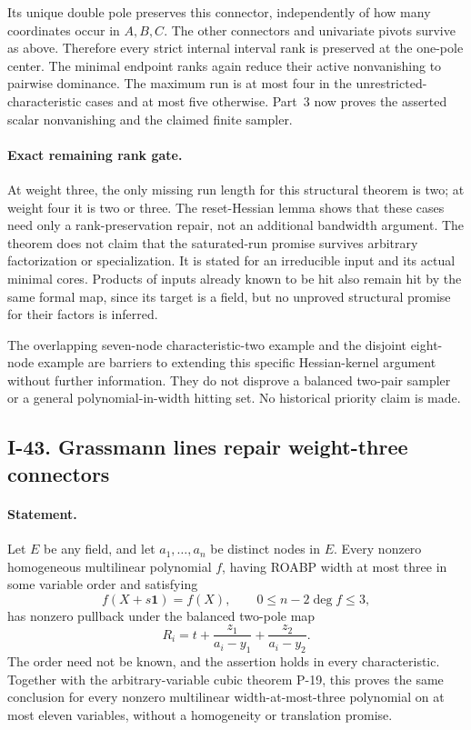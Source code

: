 Its unique double pole preserves this connector, independently
of how many coordinates occur in $A,B,C$. The other connectors
and univariate pivots survive as above. Therefore every strict
internal interval rank is preserved at the one-pole center.
The minimal endpoint ranks again reduce their active
nonvanishing to pairwise dominance. The maximum run is at
most four in the unrestricted-characteristic cases and at
most five otherwise. Part~3 now proves the asserted scalar
nonvanishing and the claimed finite sampler.

\paragraph{Exact remaining rank gate.}
At weight three, the only missing run length for this
structural theorem is two; at weight four it is two or three.
The reset-Hessian lemma shows that these cases need only a
rank-preservation repair, not an additional bandwidth argument.
The theorem does not claim that the saturated-run promise
survives arbitrary factorization or specialization. It is
stated for an irreducible input and its actual minimal cores.
Products of inputs already known to be hit also remain hit
by the same formal map, since its target is a field, but no
unproved structural promise for their factors is inferred.

The overlapping seven-node characteristic-two example and the
disjoint eight-node example are barriers to extending this
specific Hessian-kernel argument without further information.
They do not disprove a balanced two-pair sampler or a general
polynomial-in-width hitting set. No historical priority claim
is made.


\subsection{I-43. Grassmann lines repair weight-three connectors}
\label{I-43}

\paragraph{Statement.}
Let $E$ be any field, and let $a_1,\ldots,a_n$ be distinct
nodes in $E$. Every nonzero homogeneous multilinear polynomial
$f$, having ROABP width at most three in some variable order
and satisfying
\[
 f(X+s\mathbf1)=f(X),\qquad 0\le n-2\deg f\le3,
 \tag{I.156}
\]
has nonzero pullback under the balanced two-pole map
\[
 R_i=t+\frac{z_1}{a_i-y_1}+\frac{z_2}{a_i-y_2}.
 \tag{I.157}
\]
The order need not be known, and the assertion holds in every
characteristic. Together with the arbitrary-variable cubic
theorem P-19, this proves the same conclusion for every
nonzero multilinear width-at-most-three polynomial on at most
eleven variables, without a homogeneity or translation promise.

